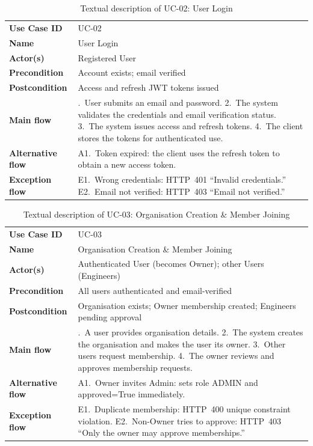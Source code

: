 \begin{longtable}{@{}>{\raggedright\arraybackslash}p{} >{\raggedright\arraybackslash}p{}@{}}
\caption{Textual description of UC-02: User Login}\label{tab:uc02}\\
\toprule
\textbf{Use Case ID} & UC-02\\
\textbf{Name} & User Login\\
\textbf{Actor(s)} & Registered User\\
\textbf{Precondition} & Account exists; email verified\\
\textbf{Postcondition} & Access and refresh JWT tokens issued\\
\textbf{Main flow} &
  1.~User submits an email and password.
  2.~The system validates the credentials and email verification status.
  3.~The system issues access and refresh tokens.
  4.~The client stores the tokens for authenticated use.\\
\textbf{Alternative flow} &
  A1.~Token expired: the client uses the refresh token to obtain a new access token.\\
\textbf{Exception flow} &
  E1.~Wrong credentials: HTTP~401 ``Invalid credentials.''
  E2.~Email not verified: HTTP~403 ``Email not verified.''\\
\bottomrule
\end{longtable}

\begin{longtable}{@{}>{\raggedright\arraybackslash}p{} >{\raggedright\arraybackslash}p{}@{}}
\caption{Textual description of UC-03: Organisation Creation \& Member Joining}\label{tab:uc03}\\
\toprule
\textbf{Use Case ID} & UC-03\\
\textbf{Name} & Organisation Creation \& Member Joining\\
\textbf{Actor(s)} & Authenticated User (becomes Owner); other Users (Engineers)\\
\textbf{Precondition} & All users authenticated and email-verified\\
\textbf{Postcondition} & Organisation exists; Owner membership created; Engineers pending approval\\
\textbf{Main flow} &
  1.~A user provides organisation details.
  2.~The system creates the organisation and makes the user its owner.
  3.~Other users request membership.
  4.~The owner reviews and approves membership requests.\\
\textbf{Alternative flow} &
  A1.~Owner invites Admin: sets role ADMIN and approved=True immediately.\\
\textbf{Exception flow} &
  E1.~Duplicate membership: HTTP~400 unique constraint violation.
  E2.~Non-Owner tries to approve: HTTP~403 ``Only the owner may approve memberships.''\\
\bottomrule
\end{longtable}


